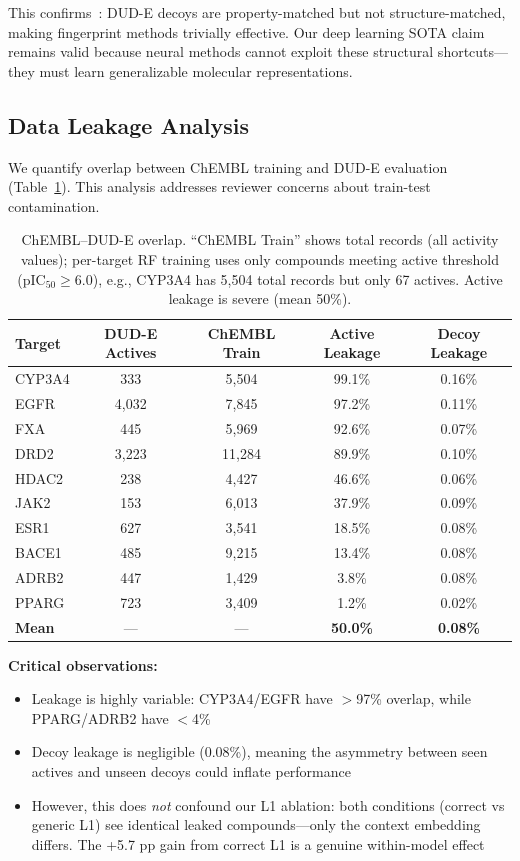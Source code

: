 \documentclass[sigconf]{acmart}
\begin{document}
This confirms~\cite{wallach_2018_dude_bias}: DUD-E decoys are property-matched but not structure-matched, making fingerprint methods trivially effective. Our deep learning SOTA claim remains valid because neural methods cannot exploit these structural shortcuts---they must learn generalizable molecular representations.

\subsection{Data Leakage Analysis}

We quantify overlap between ChEMBL training and DUD-E evaluation (Table~\ref{tab:leakage}). This analysis addresses reviewer concerns about train-test contamination.

\begin{table}[h]
\caption{ChEMBL--DUD-E overlap. ``ChEMBL Train'' shows total records (all activity values); per-target RF training uses only compounds meeting active threshold (pIC$_{50} \geq 6.0$), e.g., CYP3A4 has 5{,}504 total records but only 67 actives. Active leakage is severe (mean 50\%).}
\label{tab:leakage}
\centering
\small
\begin{tabular}{@{}lcccc@{}}
\toprule
Target & DUD-E Actives & ChEMBL Train & Active Leakage & Decoy Leakage \\
\midrule
CYP3A4 & 333 & 5{,}504 & 99.1\% & 0.16\% \\
EGFR & 4{,}032 & 7{,}845 & 97.2\% & 0.11\% \\
FXA & 445 & 5{,}969 & 92.6\% & 0.07\% \\
DRD2 & 3{,}223 & 11{,}284 & 89.9\% & 0.10\% \\
HDAC2 & 238 & 4{,}427 & 46.6\% & 0.06\% \\
JAK2 & 153 & 6{,}013 & 37.9\% & 0.09\% \\
ESR1 & 627 & 3{,}541 & 18.5\% & 0.08\% \\
BACE1 & 485 & 9{,}215 & 13.4\% & 0.08\% \\
ADRB2 & 447 & 1{,}429 & 3.8\% & 0.08\% \\
PPARG & 723 & 3{,}409 & 1.2\% & 0.02\% \\
\midrule
\textbf{Mean} & --- & --- & \textbf{50.0\%} & \textbf{0.08\%} \\
\bottomrule
\end{tabular}
\end{table}

\textbf{Critical observations:}
\begin{itemize}[noitemsep,topsep=0pt]
\item Leakage is highly variable: CYP3A4/EGFR have $>$97\% overlap, while PPARG/ADRB2 have $<$4\%
\item Decoy leakage is negligible (0.08\%), meaning the asymmetry between seen actives and unseen decoys could inflate performance
\item However, this does \textit{not} confound our L1 ablation: both conditions (correct vs generic L1) see identical leaked compounds---only the context embedding differs. The +5.7 pp gain from correct L1 is a genuine within-model effect
\end{itemize}
\end{document}
